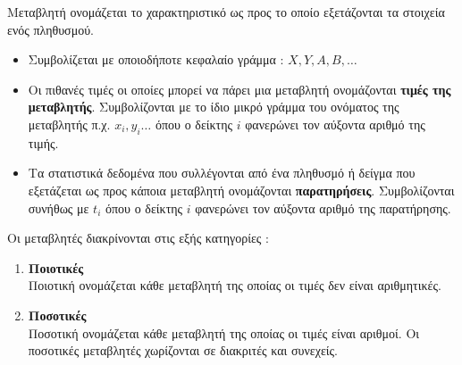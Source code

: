 Μεταβλητή ονομάζεται το χαρακτηριστικό ως προς το οποίο εξετάζονται τα στοιχεία ενός πληθυσμού.
\begin{itemize}
\item Συμβολίζεται με οποιοδήποτε κεφαλαίο γράμμα : $ X,Y,A,B,\ldots $
\item Οι πιθανές τιμές οι οποίες μπορεί να πάρει μια μεταβλητή ονομάζονται \textbf{τιμές της μεταβλητής}. Συμβολίζονται με το ίδιο μικρό γράμμα του ονόματος της μεταβλητής π.χ. $ x_i,y_i\ldots $ όπου ο δείκτης $ i $ φανερώνει τον αύξοντα αριθμό της τιμής.
\item Τα στατιστικά δεδομένα που συλλέγονται από ένα πληθυσμό ή δείγμα που εξετάζεται ως προς κάποια μεταβλητή ονομάζονται \textbf{παρατηρήσεις}. Συμβολίζονται συνήθως με $ t_i $ όπου ο δείκτης $ i $ φανερώνει τον αύξοντα αριθμό της παρατήρησης.
\end{itemize} 
Οι μεταβλητές διακρίνονται στις εξής κατηγορίες :
\begin{enumerate}[label=\bf\arabic*.]
\item \textbf{Ποιοτικές}\\
Ποιοτική ονομάζεται κάθε μεταβλητή της οποίας οι τιμές δεν είναι αριθμητικές.
\item \textbf{Ποσοτικές}\\
Ποσοτική ονομάζεται κάθε μεταβλητή της οποίας οι τιμές είναι αριθμοί. Οι ποσοτικές μεταβλητές χωρίζονται σε διακριτές και συνεχείς.
\end{enumerate}

